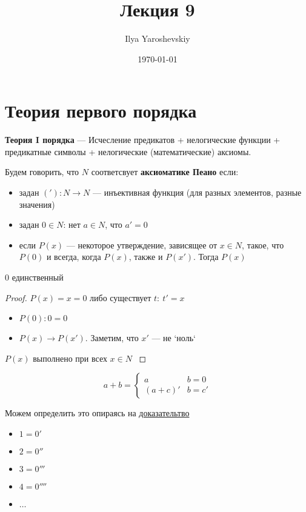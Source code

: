 \documentclass[english]{article}
\author{Ilya Yaroshevskiy}
\date{\today}
\title{Лекция 9}
\begin{document}
\maketitle
\tableofcontents


\section{Теория первого порядка}
\label{sec:orgd2391a4}
\begin{definition}
	\textbf{Теория I порядка} --- Исчесление предикатов + нелогические функции + предикатные символы + нелогические (математические) аксиомы.
	\label{org150f8a2}
\end{definition}
\begin{definition}
	Будем говорить, что \(N\) соответсвует \textbf{аксиоматике Пеано} если:
	\begin{itemize}
		\item задан \(('): N \to N\) --- инъективная функция (для разных элементов, разные значения)
		\item задан \(0 \in N\): нет \(a \in N\), что \(a' = 0\)
		\item если \(P(x)\) --- некоторое утверждение, зависящее от \(x \in N\), такое, что \(P(0)\) и всегда, когда \(P(x)\), также и \(P(x')\). Тогда \(P(x)\)
	\end{itemize}
	\label{orgf24eb27}
\end{definition}
\beginproperty
\begin{property}
	\(0\) единственный
	\label{orgcb301aa}
\end{property}
\begin{proof}
	\(P(x)=x = 0\) либо существует \(t:\ t' = x\)
	\begin{itemize}
		\item \(P(0): 0 = 0\)
		\item \(P(x) \to P(x')\). Заметим, что \(x'\) --- не `ноль`
	\end{itemize}
	\(P(x)\) выполнено при всех \(x \in N\)
	\label{orge9b4e01}
\end{proof}
\begin{definition}
	\[ a + b = \begin{cases}
			a        & b = 0  \\
			(a + c)' & b = c'
		\end{cases}\]
	\label{orgbf96441}
\end{definition}
Можем определить это опираясь на \hyperref[orge9b4e01]{доказательтво}
\begin{definition}
	\-
	\begin{itemize}
		\item \(1 = 0'\)
		\item \(2 = 0''\)
		\item \(3 = 0'''\)
		\item \(4 = 0''''\)
		\item \(\dots\)
	\end{itemize}
\end{definition}
\end{document}

